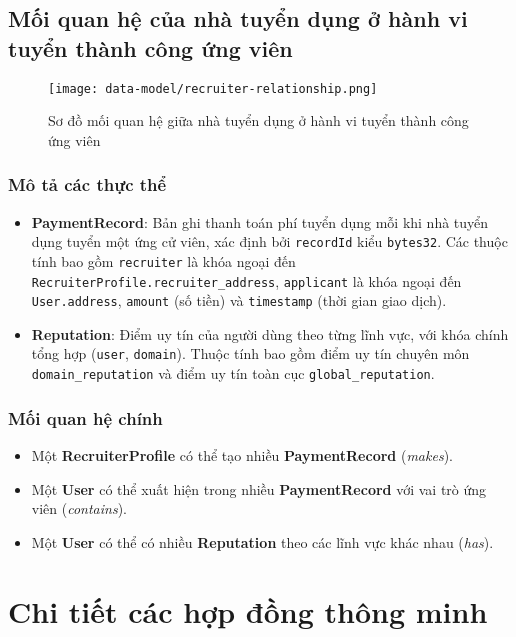 \subsection{Mối quan hệ của nhà tuyển dụng ở hành vi tuyển thành công ứng viên}

\begin{figure}[H]
  \centering
  \texttt{[image: data-model/recruiter-relationship.png]}
  \caption{Sơ đồ mối quan hệ giữa nhà tuyển dụng ở hành vi tuyển thành công ứng viên}
  \label{fig:recruiter-relationship}
\end{figure}

\subsubsection{Mô tả các thực thể}

\begin{itemize}
  \item \textbf{PaymentRecord}: Bản ghi thanh toán phí tuyển dụng mỗi khi nhà tuyển dụng tuyển một ứng cử viên, xác định bởi \texttt{recordId} kiểu \texttt{bytes32}. Các thuộc tính bao gồm \texttt{recruiter} là khóa ngoại đến \texttt{RecruiterProfile.recruiter\_address}, \texttt{applicant} là khóa ngoại đến \texttt{User.address}, \texttt{amount} (số tiền) và \texttt{timestamp} (thời gian giao dịch).
  \item \textbf{Reputation}: Điểm uy tín của người dùng theo từng lĩnh vực, với khóa chính tổng hợp (\texttt{user}, \texttt{domain}). Thuộc tính bao gồm điểm uy tín chuyên môn \texttt{domain\_reputation} và điểm uy tín toàn cục \texttt{global\_reputation}.
\end{itemize}

\subsubsection{Mối quan hệ chính}
\begin{itemize}
  \item Một \textbf{RecruiterProfile} có thể tạo nhiều \textbf{PaymentRecord} (\emph{makes}).
  \item Một \textbf{User} có thể xuất hiện trong nhiều \textbf{PaymentRecord} với vai trò ứng viên (\emph{contains}).
  \item Một \textbf{User} có thể có nhiều \textbf{Reputation} theo các lĩnh vực khác nhau (\emph{has}).
\end{itemize}

\section{Chi tiết các hợp đồng thông minh}

